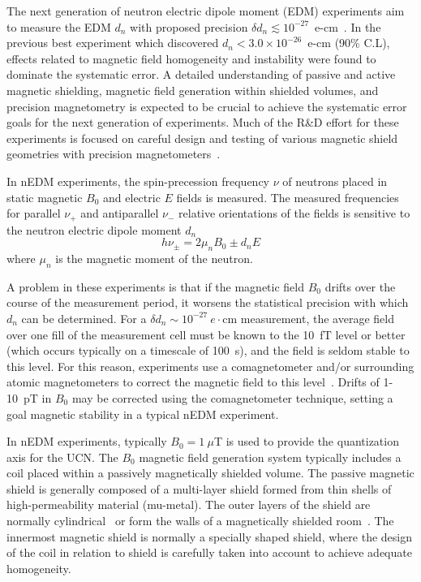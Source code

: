 \documentclass[review]{elsarticle}
\begin{document}
The next generation of neutron electric dipole moment (EDM)
experiments aim to measure the EDM $d_n$ with proposed precision
$\delta d_n\lesssim
10^{-27}$~e-cm~\cite{bib:nedm2,bib:nedm2.5,bib:nedm3,bib:nedm3.5,bib:nedm4,bib:nedm5,bib:nedm6,bib:nedm6.5}.
In the previous best experiment \cite{bib:baker,bib:pendlebury} which
discovered $d_n<3.0\times 10^{-26}$~e-cm (90\% C.L), effects related
to magnetic field homogeneity and instability were found to dominate
the systematic error.  A detailed understanding of passive and active
magnetic shielding, magnetic field generation within shielded volumes,
and precision magnetometry is expected to be crucial to achieve the
systematic error goals for the next generation of experiments.  Much
of the R\&D effort for these experiments is focused on careful design
and testing of various magnetic shield geometries with precision
magnetometers~\cite{bib:brys,bib:afach,bib:fierlingerroom,bib:sturmthesis,bib:patton}.

In nEDM experiments, the spin-precession frequency $\nu$ of neutrons
placed in static magnetic $B_0$ and electric $E$ fields is measured.
The measured frequencies for parallel $\nu_+$ and antiparallel $\nu_-$
relative orientations of the fields is sensitive to the neutron
electric dipole moment $d_n$
\begin{equation}
h\nu_\pm=2\mu_nB_0\pm d_nE
\end{equation}
where $\mu_n$ is the magnetic moment of the neutron.

A problem in these experiments is that if the magnetic field $B_0$
drifts over the course of the measurement period, it worsens the
statistical precision with which $d_n$ can be determined.  For a
$\delta d_n\sim 10^{-27}~e\cdot$cm measurement, the average field over
one fill of the measurement cell must be known to the 10~fT level or
better (which occurs typically on a timescale of 100~s), and the field
is seldom stable to this level.  For this reason, experiments use a
comagnetometer and/or surrounding atomic magnetometers to correct the
magnetic field to this level~\cite{bib:nedm4,bib:afach,bib:brys}.
Drifts of 1-10~pT in $B_0$ may be corrected using the comagnetometer
technique, setting a goal magnetic stability in a typical nEDM
experiment.

In nEDM experiments, typically $B_0=1~\mu$T is used to provide the
quantization axis for the UCN.  The $B_0$ magnetic field generation
system typically includes a coil placed within a passively
magnetically shielded volume.  The passive magnetic shield is
generally composed of a multi-layer shield formed from thin shells of
high-permeability material (mu-metal).  The outer layers of the shield
are normally cylindrical~\cite{bib:nedm3.5,bib:nedm2} or form the
walls of a magnetically shielded room~\cite{bib:altarev2014}.  The
innermost magnetic shield is normally a specially shaped shield, where
the design of the coil in relation to shield is carefully taken into
account to achieve adequate homogeneity.
\end{document}

